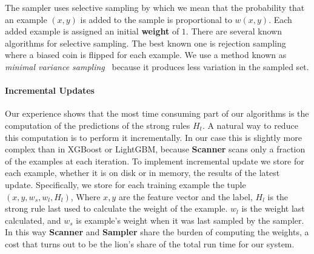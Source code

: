 The sampler uses selective sampling by which we mean that the
probability that an example $(x,y)$ is added to the sample is
proportional to $w(x,y)$. Each added example is assigned an initial
{\bf weight} of $1$.
{There are several known algorithms
  for selective sampling. The best known one is rejection sampling
  where a biased coin is flipped for each example. We use a method
  known as \textit{minimal variance sampling}~\cite{kitagawa_monte_1996}
  because it produces less variation in the sampled set.}
  
\paragraph*{Incremental Updates} Our experience shows that the most
time consuming part of our algorithms is the computation of the
predictions of the strong rules $H_t$. A natural way to reduce this
computation is to perform it incrementally. In our case this is
slightly more complex than in XGBoost or LightGBM, because {\bf
  Scanner} scans only a  fraction of the examples at each
iteration. To implement incremental update we store for each example,
whether it is on disk or in memory, the results of the latest
update. Specifically, we store for each training example the tuple
$(x, y, w_s, w_l,H_l)$, Where $x,y$ are the feature vector and the
label, $H_l$ is the strong rule last used to calculate the weight of
the example. $w_l$ is the weight last calculated, and $w_s$ is
example's weight when it was last sampled by the sampler. In this way
{\bf Scanner} and {\bf Sampler} share the burden of computing
the weights, a cost that turns out to be the lion's share of the total
run time for our system.




